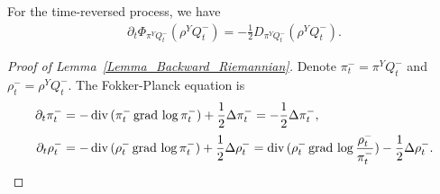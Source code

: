 \begin{lemma}\label{Lemma_Backward_Riemannian}
    For the time-reversed process, we have 
    \begin{align*}
        \partial_{t} \Phi_{\pi^{Y} Q_{t}^{-}}(\rho^{Y} Q_{t}^{-}) = - \frac{1}{2} D_{\pi^{Y} Q_{t}^{-}} (\rho^{Y} Q_{t}^{-}).
    \end{align*}
\end{lemma}
\begin{proof}[Proof of Lemma~\ref{Lemma_Backward_Riemannian}]
Denote $\pi_{t}^{-} = \pi^{Y} Q_{t}^{-}$ and $\rho_{t}^{-} = \rho^{Y} Q_{t}^{-}$.
    The Fokker-Planck equation is 
    \begin{align*}
            \partial_{t} \pi_{t}^{-} &= - \operatorname{div\,} (\pi_{t}^{-} \operatorname{grad\,} \log \pi_{t}^{-}) + \frac{1}{2} \Delta \pi_{t}^{-} = - \frac{1}{2} \Delta \pi_{t}^{-}, \\
            \partial_{t} \rho_{t}^{-} &= - \operatorname{div\,} (\rho_{t}^{-} \operatorname{grad\,} \log \pi_{t}^{-}) + \frac{1}{2} \Delta \rho_{t}^{-}
            = \operatorname{div\,} (\rho_{t}^{-} \operatorname{grad\,} \log \frac{\rho_{t}^{-}}{\pi_{t}^{-}} ) - \frac{1}{2} \Delta \rho_{t}^{-}.
    \end{align*}


\end{proof}
